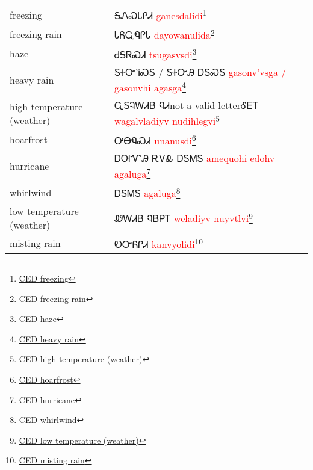 \begin{minipage}{\linewidth}
\begin{tabular}{p{5cm} p{9cm}}
freezing & ᎦᏁᏍᏓᎵᏗ 
 \newline \textcolor{red}{ganesdalidi}\footnote{\href{https://cherokeedictionary.net/share/101962}{CED freezing}}\\
freezing rain & ᏓᏲᏩᏄᎵᏓ 
 \newline \textcolor{red}{dayowanulida}\footnote{\href{https://cherokeedictionary.net/share/101963}{CED freezing rain}}\\
haze & ᏧᎦᏒᏍᏗ 
 \newline \textcolor{red}{tsugasvsdi}\footnote{\href{https://cherokeedictionary.net/share/101964}{CED haze}}\\
heavy rain & ᎦᏐᏅ'ᎥᏍᎦ / ᎦᏐᏅᎯ  ᎠᎦᏍᎦ 
 \newline \textcolor{red}{gasonv'vsga / gasonvhi  agasga}\footnote{\href{https://cherokeedictionary.net/share/101965}{CED heavy rain}}\\
high temperature (weather) & ᏩᎦᎸᎳᏗᏴ ᏄᏗnot a valid letterᎴᎬᎢ 
 \newline \textcolor{red}{wagalvladiyv nudihlegvi}\footnote{\href{https://cherokeedictionary.net/share/101966}{CED high temperature (weather)}}\\
hoarfrost & ᎤᎾᏄᏍᏗ 
 \newline \textcolor{red}{unanusdi}\footnote{\href{https://cherokeedictionary.net/share/101967}{CED hoarfrost}}\\
hurricane & ᎠᎺᏉᎯ  ᎡᏙᎲ ᎠᎦᎷᎦ 
 \newline \textcolor{red}{amequohi  edohv agaluga}\footnote{\href{https://cherokeedictionary.net/share/101968}{CED hurricane}}\\
whirlwind & ᎠᎦᎷᎦ 
 \newline \textcolor{red}{agaluga}\footnote{\href{https://cherokeedictionary.net/share/101969}{CED whirlwind}}\\
low temperature (weather) & ᏪᎳᏗᏴ ᏄᏴᏢᎢ 
 \newline \textcolor{red}{weladiyv nuyvtlvi}\footnote{\href{https://cherokeedictionary.net/share/101970}{CED low temperature (weather)}}\\
misting rain & ᎧᏅᏲᎵᏗ 
 \newline \textcolor{red}{kanvyolidi}\footnote{\href{https://cherokeedictionary.net/share/101971}{CED misting rain}}\\
\end{tabular}
\end{minipage}

